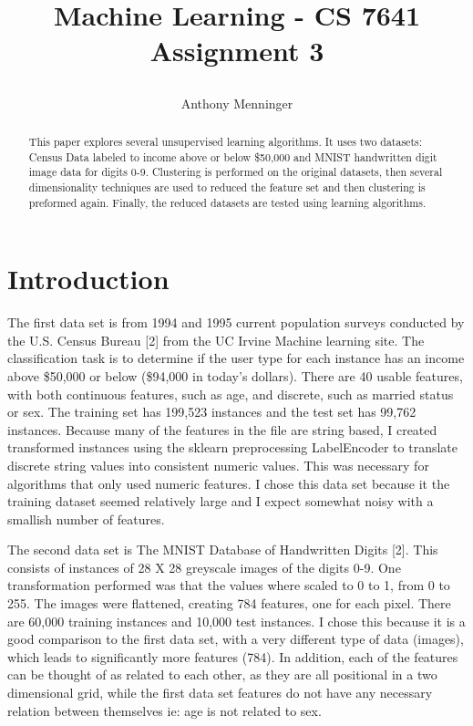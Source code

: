 \documentclass[letterpaper]{article} %
\title{
Machine Learning - CS 7641
Assignment 3
	
}
\author {
    Anthony Menninger \\
}
\begin{document}
\maketitle

\begin{abstract}
This paper explores several unsupervised learning algorithms.  It uses two datasets: Census Data labeled to income above or below \$50,000 and MNIST handwritten digit image data for digits 0-9.  Clustering is performed on the original datasets, then several dimensionality techniques are used to reduced the feature set and then clustering is preformed again.  Finally, the reduced datasets are tested using learning algorithms.  
\end{abstract}

\section{Introduction}
The first data set is from 1994 and 1995 current population surveys conducted by the U.S. Census Bureau [2] from the UC Irvine Machine learning site.  The classification task is to determine if the user type for each instance has an income above \$50,000 or below (\$94,000 in today's dollars).  There are 40 usable features, with both continuous features, such as age, and discrete, such as married status or sex.  The training set has 199,523 instances and the test set has 99,762 instances.  Because many of the features in the file are string based, I created transformed instances using the sklearn preprocessing LabelEncoder to translate discrete string values into consistent numeric values.  This was necessary for algorithms that only used numeric features. I chose this data set because it the training dataset seemed relatively large and I expect somewhat noisy with a smallish number of features.  

The second data set is The MNIST Database of Handwritten Digits [2].  This consists of instances of 28 X 28 greyscale images of the digits 0-9.  One transformation performed was that the values where scaled to 0 to 1, from 0 to 255.  The images were flattened, creating 784 features, one for each pixel.  There are 60,000 training instances and 10,000 test instances.  I chose this because it is a good comparison to the first data set, with a very different type of data (images), which leads to significantly more features (784).  In addition, each of the features can be thought of as related to each other, as they are all positional in a two dimensional grid, while the first data set features do not have any necessary relation between themselves ie:  age is not related to sex.   
\end{document}

